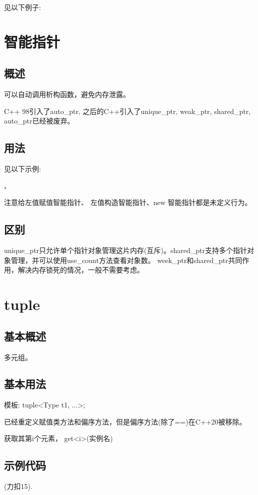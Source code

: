 \documentclass{article}
\begin{document}
    见以下例子:
    

    \section{智能指针}
    \subsection{概述}
    可以自动调用析构函数，避免内存泄露。

    C++ 98引入了auto_ptr, 之后的C++引入了unique_ptr, weak_ptr, shared_ptr, auto_ptr已经被废弃。

    \subsection{用法}
    见以下示例:

    、

    注意给左值赋值智能指针、 左值构造智能指针、new 智能指针都是未定义行为。 

    \subsection{区别}
    unique\_ptr只允许单个指针对象管理这片内存(互斥)。shared\_ptr支持多个指针对象管理，并可以使用use\_count方法查看对象数。
    week\_ptr和shared\_ptr共同作用，解决内存锁死的情况，一般不需要考虑。

    \section{tuple}
    \subsection{基本概述}
    多元组。

    \subsection{基本用法}
    模板:
    tuple<Type t1, ...>;

    已经重定义赋值类方法和偏序方法，但是偏序方法(除了==)在C++20被移除。

    获取其第i个元素， get<i>(实例名)

    \subsection{示例代码}
    (力扣15).
    
\end{document}
